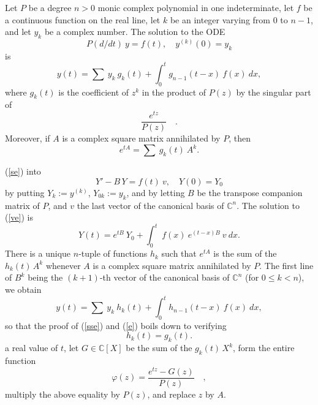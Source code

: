 \documentclass[12pt]{article}
\begin{document}
Let $P$ be a degree $n>0$ monic complex polynomial in one indeterminate, let $f$ be a continuous function on the real line, let $k$ be an integer varying from 0 to $n-1$, and let $y_k$ be a complex number. The solution to the ODE
%
\begin{equation}\label{se}P(d/d t)\ y=f(t),\quad
y^{(k)}(0)=y_k
\end{equation}
%
is
%
\begin{equation}\label{sse}
y(t)=\sum\ y_k\ g_k(t)+\int_0^t g_{n-1}(t-x)\ f(x)\ d x,
\end{equation}
%
where $g_k(t)$ is the coefficient of $z^k$ in the product of $P(z)$ by the singular part of
%
$$\frac{e^{t z}}{P(z)}\quad.$$
%
Moreover, if $A$ is a complex square matrix annihilated by $P$, then 
%
\begin{equation}\label{e}e^{t A}=\sum\ g_k(t)\ A^k.
\end{equation}


 (\ref{se}) into
%
\begin{equation}\label{ve}
Y'-B\,Y=f(t)\ v,\quad Y(0)=Y_0
\end{equation}
%
by putting $Y_k:=y^{(k)}$, $Y_{0k}:=y_k$, and by letting $B$ be the transpose companion matrix of $P$, and $v$ the last vector of the canonical basis of $\mathbb{C}^n$. The solution to (\ref{ve}) is
%
$$Y(t)=e^{t B}\ Y_0+\int_0^t\ f(x)\ e^{(t-x)B}\ v\ d x.$$
%
There is a unique $n$-tuple of functions $h_k$ such that
$e^{t A}$ is the sum of the $h_k(t)\,A^k$ whenever $A$ is a complex square matrix annihilated by $P$. The first line of $B^k$ being the $(k+1)$-th vector of the canonical basis of $\mathbb{C}^n$ (for $0\le k<n$), we obtain
%
$$y(t)=\sum\ y_k\ h_k(t)
+\int_0^t h_{n-1}(t-x)\ f(x)\ d x,$$
%
so that the proof of (\ref{sse}) and (\ref{e}) boils down to verifying
%
$$h_k(t)=g_k(t).$$
%
 a real value of $t$, let $G\in\mathbb{C}[X]$ be the sum of the $g_k(t)\, X^k$, form the entire function 
%
$$\varphi(z)=\frac{e^{t z}-G(z)}{P(z)}\quad,$$
%
multiply the above equality by $P(z)$, and replace $z$ by $A$. 
\end{document}
